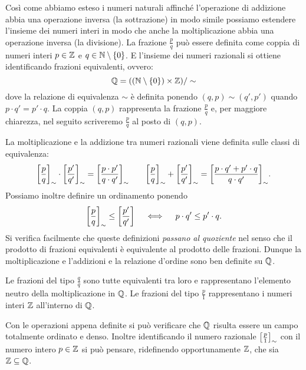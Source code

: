 Così come abbiamo esteso i numeri naturali affinché l'operazione di addizione abbia 
una operazione inversa (la sottrazione) in modo simile possiamo estendere l'insieme 
dei numeri interi in modo che anche la moltiplicazione abbia una operazione inversa 
(la divisione). 
La frazione $\frac p q$ può essere definita come coppia 
di numeri interi $p\in {\mathbb Z}$ e $q\in {\mathbb N}\setminus {\left\{ 0 \right\}}$. 
E l'insieme dei numeri razionali si ottiene identificando 
frazioni equivalenti, ovvero: 
\[
  {\mathbb Q} = (({\mathbb N} \setminus{\left\{ 0 \right\}})\times {\mathbb Z})/\sim  
\]
dove la relazione di equivalenza $\sim$ è definita ponendo 
$(q,p) \sim (q',p')$ quando $p\cdot q' = p'\cdot q$.
La coppia $(q,p)$ rappresenta la frazione $\frac p q$ e, 
per maggiore chiarezza, nel seguito scriveremo $\frac p q$ 
al posto di $(q,p)$.

%
La moltiplicazione e la addizione tra numeri razionali viene definita
sulle classi di equivalenza:
\[
 {\left[ \frac p q \right]}_\sim \cdot {\left[ \frac{p'}{q'} \right]}_\sim 
 = {\left[ \frac{p\cdot p'}{q\cdot q'} \right]}_\sim 
 \qquad 
 {\left[ \frac{p}{q} \right]}_\sim + {\left[ \frac{p'}{q'} \right]}_\sim 
 = {\left[ \frac{p\cdot q' + p'\cdot q}{q\cdot q'} \right]}_\sim.
\]
Possiamo inoltre definire un ordinamento ponendo
\[
 {\left[ \frac p q \right]}_\sim \le {\left[ \frac{p'}{q'} \right]}
 \quad\iff  \quad p \cdot q' \le p' \cdot q.
\]
Si verifica facilmente che queste definizioni \emph{passano al quoziente} 
nel senso che il prodotto di frazioni equivalenti è equivalente al prodotto 
delle frazioni. 
Dunque la moltiplicazione e l'addizioni 
e la relazione d'ordine sono ben definite su ${\mathbb Q}$.

Le frazioni del tipo $\frac{q}{q}$ sono tutte equivalenti tra loro e rappresentano 
l'elemento neutro della moltiplicazione in ${\mathbb Q}$.
Le frazioni del tipo $\frac{p}{1}$ rappresentano 
i numeri interi ${\mathbb Z}$ all'interno di ${\mathbb Q}$.

Con le operazioni appena definite si può verificare che ${\mathbb Q}$ 
risulta essere un campo totalmente ordinato e denso.
Inoltre identificando il numero razionale ${\left[ \frac p 1 \right]}_\sim$
con il numero intero $p\in {\mathbb Z}$ si può pensare, ridefinendo opportunamente 
${\mathbb Z}$, che sia ${\mathbb Z} \subseteq {\mathbb Q}$.

